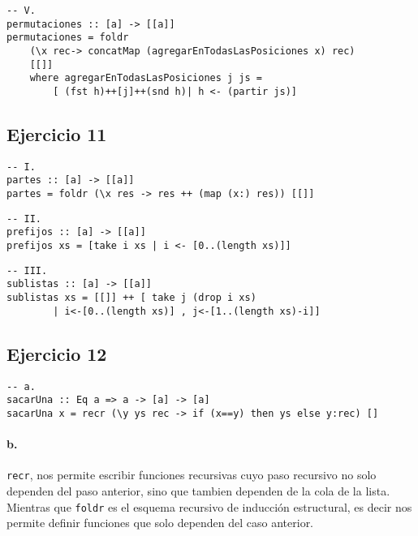 \documentclass[10pt,a4paper]{article}
\begin{document}
\begin{centrado}
	\begin{verbatim}
-- V.
permutaciones :: [a] -> [[a]]
permutaciones = foldr 
	(\x rec-> concatMap (agregarEnTodasLasPosiciones x) rec) 
	[[]] 
	where agregarEnTodasLasPosiciones j js = 
		[ (fst h)++[j]++(snd h)| h <- (partir js)]
	\end{verbatim}
\end{centrado}

\subsection{Ejercicio 11}

\begin{centrado}
	\begin{verbatim}
-- I.
partes :: [a] -> [[a]]
partes = foldr (\x res -> res ++ (map (x:) res)) [[]]
	\end{verbatim}
\end{centrado}

\begin{centrado}
	\begin{verbatim}
-- II.
prefijos :: [a] -> [[a]]
prefijos xs = [take i xs | i <- [0..(length xs)]]
	\end{verbatim}
\end{centrado}

\begin{centrado}
	\begin{verbatim}
-- III.
sublistas :: [a] -> [[a]]
sublistas xs = [[]] ++ [ take j (drop i xs)  
		| i<-[0..(length xs)] , j<-[1..(length xs)-i]]
	\end{verbatim}
\end{centrado}


\subsection{Ejercicio 12}
\begin{centrado}
	\begin{verbatim}
-- a.
sacarUna :: Eq a => a -> [a] -> [a]
sacarUna x = recr (\y ys rec -> if (x==y) then ys else y:rec) []
	\end{verbatim}
\end{centrado}

\paragraph{b.} \texttt{recr}, nos permite escribir funciones recursivas cuyo paso recursivo no solo dependen del paso anterior, sino que tambien dependen de la cola de la lista. Mientras que \texttt{foldr} es el esquema recursivo de inducción estructural, es decir nos permite definir funciones que solo dependen del caso anterior.
\end{document}
